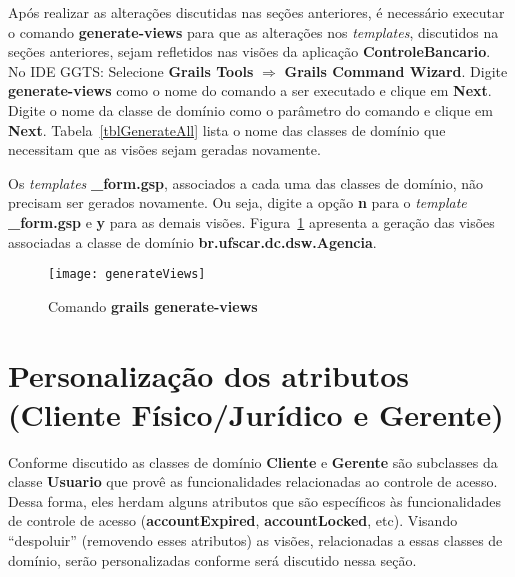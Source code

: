 \vspace{0.5cm}

Após  realizar as  alterações  discutidas nas  seções  anteriores, é  necessário
executar  o  comando  {\bf  generate-views}  para que  as  alterações  nos  {\it
  templates}, discutidos  na seções anteriores,  sejam refletidos nas  visões da
aplicação  {\bf ControleBancario}.  No  IDE GGTS:  Selecione {\bf  Grails Tools}
$\Longrightarrow$ {\bf Grails Command Wizard}.  Digite {\bf generate-views} como
o  nome do  comando a  ser executado  e  clique em  {\bf Next}.   Digite o  nome
da  classe de  domínio  como o  parâmetro do  comando  e clique  em {\bf  Next}.
Tabela~\ref{tblGenerateAll} lista  o nome das classes de  domínio que necessitam
que as visões sejam geradas novamente.

\vspace{0.5cm}

 Os  {\it templates}  {\bf \_form.gsp},  associados a
cada uma  das classes de domínio,  não precisam ser gerados  novamente. Ou seja,
digite a opção {\bf n} para o  {\it template} {\bf \_form.gsp} e {\bf y} para as
demais  visões.  Figura~\ref{figGenerateViews}  apresenta a  geração  das visões
associadas a classe de domínio {\bf br.ufscar.dc.dsw.Agencia}.  

\vspace{0.3cm}

\begin{figure}[htbp]
\centering\texttt{[image: generateViews]}
\caption{Comando {\bf grails generate-views}}
\label{figGenerateViews}
\end{figure}

\newpage

\section{Personalização dos atributos (Cliente Físico/Jurídico e Gerente)}

\vspace{0.3cm}

Conforme  discutido as  classes de  domínio {\bf  Cliente} e  {\bf  Gerente} são
subclasses da classe {\bf Usuario}  que provê as funcionalidades relacionadas ao
controle  de  acesso.   Dessa  forma,  eles  herdam  alguns  atributos  que  são
específicos às funcionalidades de controle de acesso ({\bf accountExpired}, {\bf
  accountLocked},  etc). Visando  ``despoluir'' (removendo  esses  atributos) as
visões, relacionadas  a essas classes de domínio,  serão personalizadas conforme
será discutido nessa seção. 

